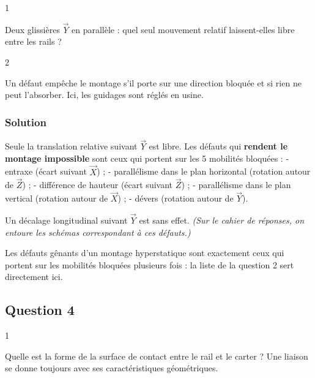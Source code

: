 \documentclass[11pt,a4paper]{article}
\begin{document}
\begin{indication}{1}

Deux glissières \(\vec Y\) en parallèle : quel seul mouvement relatif laissent-elles libre entre les rails ?

\end{indication}

\begin{indication}{2}

Un défaut empêche le montage s'il porte sur une direction bloquée et si rien ne peut l'absorber. Ici, les guidages sont réglés en usine.

\end{indication}

\hypertarget{solution-2}{%
\subsubsection{Solution}\label{solution-2}}

Seule la translation relative suivant \(\vec Y\) est libre. Les défauts qui \textbf{rendent le montage impossible} sont ceux qui portent sur les 5 mobilités bloquées :
- entraxe (écart suivant \(\vec X\)) ;
- parallélisme dans le plan horizontal (rotation autour de \(\vec Z\)) ;
- différence de hauteur (écart suivant \(\vec Z\)) ;
- parallélisme dans le plan vertical (rotation autour de \(\vec X\)) ;
- dévers (rotation autour de \(\vec Y\)).

Un décalage longitudinal suivant \(\vec Y\) est sans effet. \emph{(Sur le cahier de réponses, on entoure les schémas correspondant à ces défauts.)}

\begin{methode}

Les défauts gênants d'un montage hyperstatique sont exactement ceux qui portent sur les mobilités bloquées plusieurs fois : la liste de la question 2 sert directement ici.

\end{methode}

\hypertarget{question-4}{%
\subsection{Question 4}\label{question-4}}

\begin{indication}{1}

Quelle est la forme de la surface de contact entre le rail et le carter ? Une liaison se donne toujours avec ses caractéristiques géométriques.

\end{indication}
\end{document}
